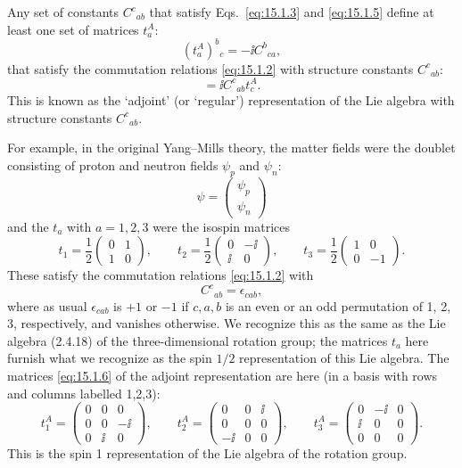 Any set of constants $C^c{}_{ab}$ that satisfy
Eqs.~\eqref{eq:15.1.3} and \eqref{eq:15.1.5} define at least one set of matrices
$t^A_a$:
\begin{equation}
 (t^A_a)^b{}_c=-\ii C^b{}_{ca} ,
 \tag{15.1.6}\label{eq:15.1.6}
\end{equation}
that satisfy the commutation relations \eqref{eq:15.1.2} with structure constants
$C^c{}_{ab}$:
\begin{equation}
 [t^A_a,t^A_b]=\ii C^c{}_{ab}t^A_c .
 \tag{15.1.7}\label{eq:15.1.7}
\end{equation}
This is known as the `adjoint' (or `regular') representation of the Lie algebra
with structure constants $C^c{}_{ab}$.

For example, in the original Yang--Mills theory, the matter fields were the
doublet consisting of proton and neutron fields $\psi_p$ and $\psi_n$:
\[
 \psi=\begin{pmatrix}\psi_p\\ \psi_n\end{pmatrix}
\]
and the $t_a$ with $a=1,2,3$ were the isospin matrices
\[
 t_1=\frac12\begin{pmatrix}0&1\\1&0\end{pmatrix},\qquad
 t_2=\frac12\begin{pmatrix}0&-\ii\\\ii&0\end{pmatrix},\qquad
 t_3=\frac12\begin{pmatrix}1&0\\0&-1\end{pmatrix} .
\]
These satisfy the commutation relations \eqref{eq:15.1.2} with
\[
 C^c{}_{ab}=\epsilon_{cab} ,
\]
where as usual $\epsilon_{cab}$ is $+1$ or $-1$ if
$c,a,b$ is an even or an odd permutation of 1, 2, 3,
respectively, and vanishes otherwise. We recognize this as the same as the Lie
algebra (2.4.18) of the three-dimensional rotation group; the matrices
$t_a$ here furnish what we recognize as the spin $1/2$ representation of
this Lie algebra. The matrices \eqref{eq:15.1.6} of the adjoint representation
are here (in a basis with rows and columns labelled 1,2,3):
\[
 t^A_1=\begin{pmatrix}0&0&0\\0&0&-\ii\\0&\ii&0\end{pmatrix},\qquad
 t^A_2=\begin{pmatrix}0&0&\ii\\0&0&0\\-\ii&0&0\end{pmatrix},\qquad
 t^A_3=\begin{pmatrix}0&-\ii&0\\\ii&0&0\\0&0&0\end{pmatrix} .
\]
This is the spin 1 representation of the Lie algebra of the rotation group.

